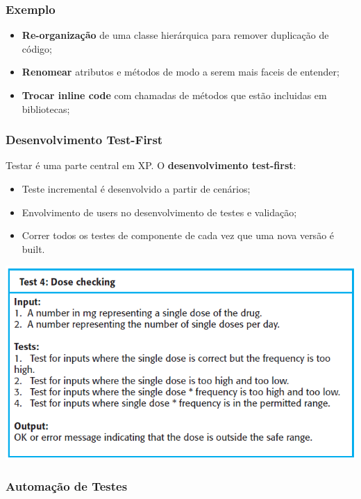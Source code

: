 \documentclass{article}
\begin{document}
\subsubsection*{Exemplo}

\begin{itemize}
  \item \textbf{Re-organização} de uma classe hierárquica para remover duplicação de código;
  \item \textbf{Renomear} atributos e métodos de modo a serem mais faceis de entender;
  \item \textbf{Trocar inline code} com chamadas de métodos que estão incluidas em bibliotecas;
\end{itemize}

\pagebreak

\subsubsection{Desenvolvimento Test-First}

Testar é uma parte central em XP. O \textbf{desenvolvimento test-first}:
\begin{itemize}
  \item Teste incremental é desenvolvido a partir de cenários;
  \item Envolvimento de users no desenvolvimento de testes e validação;
  \item Correr todos os testes de componente de cada vez que uma nova versão
  é built.
\end{itemize}

\begin{center}
  \includegraphics[scale=0.5]{25}
\end{center}

\subsubsection{Automação de Testes}
\end{document}
